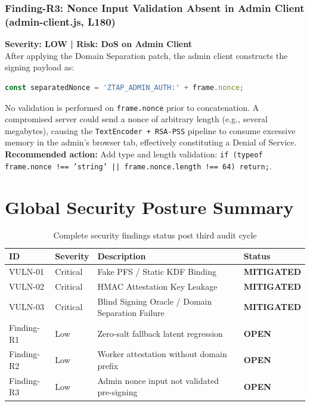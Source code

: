 \documentclass[12pt,a4paper]{article}
\begin{document}
\subsubsection{Finding-R3: Nonce Input Validation Absent in Admin Client (admin-client.js, L180)}

\begin{warningbox}
\textbf{Severity: LOW | Risk: DoS on Admin Client}\\
After applying the Domain Separation patch, the admin client constructs the signing payload as:
\begin{lstlisting}[language=JavaScript, numbers=none]
const separatedNonce = 'ZTAP_ADMIN_AUTH:' + frame.nonce;
\end{lstlisting}
No validation is performed on \texttt{frame.nonce} prior to concatenation. A compromised server could send a nonce of arbitrary length (e.g., several megabytes), causing the \texttt{TextEncoder + RSA-PSS} pipeline to consume excessive memory in the admin's browser tab, effectively constituting a Denial of Service. \textbf{Recommended action:} Add type and length validation: \texttt{if (typeof frame.nonce !== 'string' || frame.nonce.length !== 64) return;}.
\end{warningbox}

\section{Global Security Posture Summary}

\begin{table}[h!]
\centering
\begin{tabularx}{\textwidth}{llXl}
\toprule
\textbf{ID} & \textbf{Severity} & \textbf{Description} & \textbf{Status} \\
\midrule
VULN-01 & Critical & Fake PFS / Static KDF Binding & \textcolor{safegreen}{\textbf{MITIGATED}} \\
VULN-02 & Critical & HMAC Attestation Key Leakage & \textcolor{safegreen}{\textbf{MITIGATED}} \\
VULN-03 & Critical & Blind Signing Oracle / Domain Separation Failure & \textcolor{safegreen}{\textbf{MITIGATED}} \\
Finding-R1 & Low & Zero-salt fallback latent regression & \textcolor{warningyellow}{\textbf{OPEN}} \\
Finding-R2 & Low & Worker attestation without domain prefix & \textcolor{warningyellow}{\textbf{OPEN}} \\
Finding-R3 & Low & Admin nonce input not validated pre-signing & \textcolor{warningyellow}{\textbf{OPEN}} \\
\bottomrule
\end{tabularx}
\caption{Complete security findings status post third audit cycle}
\end{table}
\end{document}
